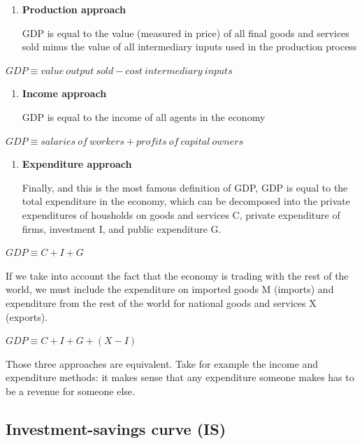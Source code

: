\documentclass[
  letterpaper,
  DIV=11,
  numbers=noendperiod]{scrreprt}
\begin{document}
\begin{enumerate}
\def\labelenumi{\arabic{enumi}.}
\item
  \textbf{Production approach}

  GDP is equal to the value (measured in price) of all final goods and
  services sold minus the value of all intermediary inputs used in the
  production process
\end{enumerate}

\(GDP \equiv value\: output\: sold - cost\: intermediary\: inputs\)

\begin{enumerate}
\def\labelenumi{\arabic{enumi}.}
\setcounter{enumi}{1}
\item
  \textbf{Income approach}

  GDP is equal to the income of all agents in the economy
\end{enumerate}

\(GDP \equiv salaries\:of\:workers + profits\:of\:capital\:owners\)

\begin{enumerate}
\def\labelenumi{\arabic{enumi}.}
\setcounter{enumi}{2}
\item
  \textbf{Expenditure approach}

  Finally, and this is the most famous definition of GDP, GDP is equal
  to the total expenditure in the economy, which can be decomposed into
  the private expenditures of housholds on goods and services C, private
  expenditure of firms, investment I, and public expenditure G.
\end{enumerate}

\(GDP \equiv C + I + G\)

If we take into account the fact that the economy is trading with the
rest of the world, we must include the expenditure on imported goods M
(imports) and expenditure from the rest of the world for national goods
and services X (exports).

\(GDP \equiv C + I + G + (X-I)\)

Those three approaches are equivalent. Take for example the income and
expenditure methods: it makes sense that any expenditure someone makes
has to be a revenue for someone else.

\hypertarget{investment-savings-curve-is}{%
\subsection{Investment-savings curve
(IS)}\label{investment-savings-curve-is}}
\end{document}
